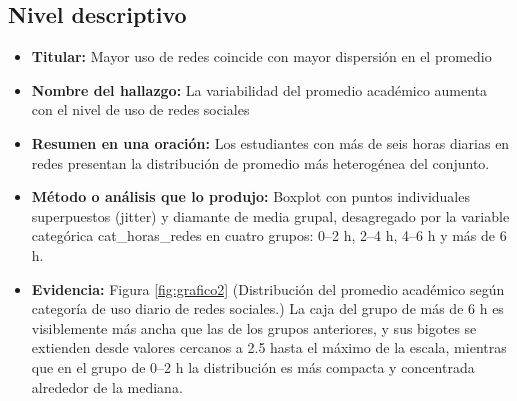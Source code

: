 \documentclass[12pt]{article}
\begin{document}
\subsection*{Nivel descriptivo}
\begin{itemize}
    \item \textbf{Titular:} Mayor uso de redes coincide con mayor dispersión en el promedio
    \item \textbf{Nombre del hallazgo:} La variabilidad del promedio académico aumenta con el nivel de uso de redes sociales
    \item \textbf{Resumen en una oración: } Los estudiantes con más de seis horas diarias en redes presentan la distribución de promedio más heterogénea del conjunto.
    \item \textbf{Método o análisis que lo produjo:} Boxplot con puntos individuales superpuestos (jitter) y diamante de media grupal, desagregado por la variable categórica cat\_horas\_redes en cuatro grupos: 0–2 h, 2–4 h, 4–6 h y más de 6 h.
    \item \textbf{Evidencia:} Figura \ref{fig:grafico2} (Distribución del promedio académico según categoría de uso diario de redes sociales.) La caja del grupo de más de 6 h es visiblemente más ancha que las de los grupos anteriores, y sus bigotes se extienden desde valores cercanos a 2.5 hasta el máximo de la escala, mientras que en el grupo de 0–2 h la distribución es más compacta y concentrada alrededor de la mediana.
\end{itemize}
\end{document}
